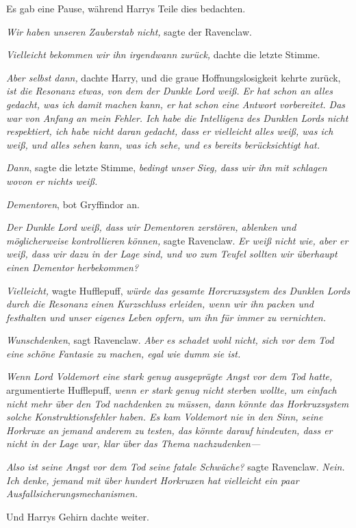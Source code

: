 {Es gab eine Pause, während Harrys Teile dies bedachten.

\emph{Wir haben unseren Zauberstab nicht,} sagte der Ravenclaw.

\emph{Vielleicht bekommen wir ihn irgendwann zurück,} dachte die letzte Stimme.

\emph{Aber selbst dann,} dachte Harry, und die graue Hoffnungslosigkeit kehrte zurück, \emph{ist die Resonanz etwas, von dem der Dunkle Lord weiß. Er hat schon an alles gedacht, was ich damit machen kann, er hat schon eine Antwort vorbereitet. Das war von Anfang an mein Fehler. Ich habe die Intelligenz des Dunklen Lords nicht respektiert, ich habe nicht daran gedacht, dass er vielleicht alles weiß, was ich weiß, und alles sehen kann, was ich sehe, und es bereits berücksichtigt hat.}

\emph{Dann}, sagte die letzte Stimme, \emph{bedingt unser Sieg, dass wir ihn mit schlagen wovon er nichts weiß.}

\emph{Dementoren}, bot Gryffindor an.

\emph{Der Dunkle Lord weiß, dass wir Dementoren zerstören, ablenken und möglicherweise kontrollieren können,} sagte Ravenclaw. \emph{Er weiß nicht wie, aber er weiß, dass wir dazu in der Lage sind, und wo zum Teufel sollten wir überhaupt einen Dementor herbekommen?}

\emph{Vielleicht,} wagte Hufflepuff, \emph{würde das gesamte Horcruxsystem des Dunklen Lords durch die Resonanz einen Kurzschluss erleiden, wenn wir ihn packen und festhalten und unser eigenes Leben opfern, um ihn für immer zu vernichten.}

\emph{Wunschdenken}, sagt Ravenclaw. \emph{Aber es schadet wohl nicht, sich vor dem Tod eine schöne Fantasie zu machen, egal wie dumm sie ist.}

\emph{\hfill\break Wenn Lord Voldemort eine stark genug ausgeprägte Angst vor dem Tod hatte,} argumentierte Hufflepuff, \emph{wenn er stark genug nicht sterben wollte, um einfach nicht mehr über den Tod nachdenken zu müssen, dann könnte das Horkruxsystem solche Konstruktionsfehler haben. Es kam Voldemort nie in den Sinn, seine Horkruxe an jemand anderem zu testen, das könnte darauf hindeuten, dass er nicht in der Lage war, klar über das Thema nachzudenken—}

\emph{Also ist seine Angst vor dem Tod seine fatale Schwäche?} sagte Ravenclaw. \emph{Nein. Ich denke, jemand mit über hundert Horkruxen hat vielleicht ein paar Ausfallsicherungsmechanismen.}

Und Harrys Gehirn dachte weiter.

}
